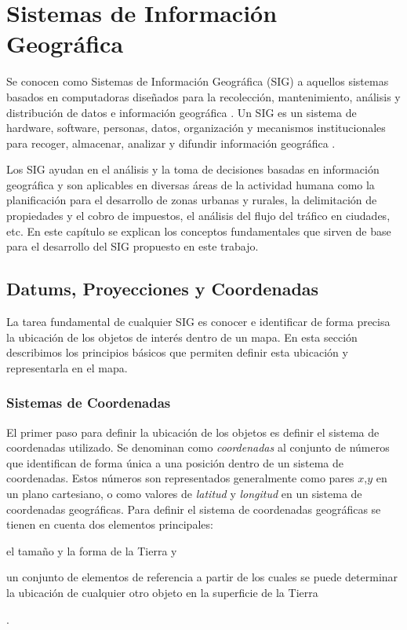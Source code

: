 \chapter{Sistemas de Información Geográfica}
\label{cap:2}

Se conocen como Sistemas de Información Geográfica (SIG) a aquellos sistemas basados en computadoras diseñados para la recolección, mantenimiento, análisis y distribución de datos e información geográfica \cite{bolstad2005gis}. Un SIG es un sistema de hardware, software, personas, datos, organización y mecanismos institucionales para recoger, almacenar, analizar y difundir información geográfica \cite{longley2005geographic}.

Los SIG ayudan en el análisis y la toma de decisiones basadas en información geográfica y son aplicables en diversas áreas de la actividad humana como la planificación para el desarrollo de zonas urbanas y rurales, la delimitación de propiedades y el cobro de  impuestos, el análisis del flujo del tráfico en ciudades, etc. En este capítulo se explican los conceptos fundamentales que sirven de base para el desarrollo del SIG propuesto en este trabajo.

\section{Datums, Proyecciones y Coordenadas}

La tarea fundamental de cualquier SIG es conocer e identificar de forma precisa la ubicación de los objetos de interés dentro de un mapa. En esta sección describimos los principios básicos que permiten definir esta ubicación y representarla en el mapa.

\subsection{Sistemas de Coordenadas}

El primer paso para definir la ubicación de los objetos es definir el sistema de coordenadas utilizado. Se denominan como \emph{coordenadas} al conjunto de números que identifican de forma única a una posición dentro de un sistema de coordenadas. Estos números son representados generalmente como pares $x$,$y$ en un plano cartesiano, o como valores de \emph{latitud} y \emph{longitud} en un sistema de coordenadas geográficas. Para definir el sistema de coordenadas geográficas se tienen en cuenta dos elementos principales: \begin{enumerate*}[1)] \item el tamaño y la forma de la Tierra y \item un conjunto de elementos de referencia a partir de los cuales se puede determinar la ubicación de cualquier otro objeto en la superficie de la Tierra\end{enumerate*}.

